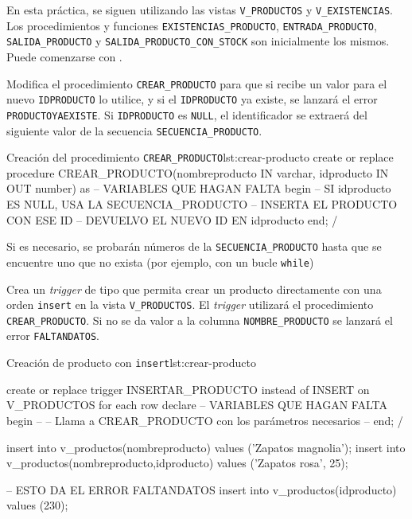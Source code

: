 En esta práctica, se siguen utilizando las vistas \texttt{V\_PRODUCTOS} y \texttt{V\_EXISTENCIAS}. Los procedimientos y funciones \texttt{EXISTENCIAS\_PRODUCTO}, \texttt{ENTRADA\_PRODUCTO}, \texttt{SALIDA\_PRODUCTO} y \texttt{SALIDA\_PRODUCTO\_CON\_STOCK} son inicialmente los mismos. Puede comenzarse con .


\begin{homeworkProblem}

  Modifica el procedimiento \texttt{CREAR\_PRODUCTO} para que si recibe un valor para el nuevo \texttt{IDPRODUCTO} lo utilice,  y si el \texttt{IDPRODUCTO} ya existe, se lanzará el error \texttt{PRODUCTOYAEXISTE}.
  Si \texttt{IDPRODUCTO} es \texttt{NULL}, el identificador se extraerá del siguiente valor de la secuencia \texttt{SECUENCIA\_PRODUCTO}.

\begin{listadosql}{Creación del procedimiento \texttt{CREAR\_PRODUCTO}}{lst:crear-producto}
create or replace procedure CREAR_PRODUCTO(nombreproducto IN varchar, idproducto IN OUT number)
as 
-- VARIABLES QUE HAGAN FALTA
begin
-- SI idproducto ES NULL, USA LA SECUENCIA_PRODUCTO
-- INSERTA EL PRODUCTO CON ESE ID
-- DEVUELVO EL NUEVO ID EN idproducto
end;
/
\end{listadosql}

  \begin{Aviso}
    Si es necesario, se probarán números de la \texttt{SECUENCIA\_PRODUCTO} hasta que se encuentre uno que no exista (por ejemplo, con un bucle \texttt{while})
  \end{Aviso}
  
  Crea un \textit{trigger} de tipo  que permita crear un producto directamente con una orden \texttt{insert} en la vista \texttt{V\_PRODUCTOS}. El \textit{trigger} utilizará el procedimiento \texttt{CREAR\_PRODUCTO}. Si no se da valor a la columna \texttt{NOMBRE\_PRODUCTO} se lanzará el error \texttt{FALTANDATOS}.
  
\begin{listadosql}{Creación de producto con \texttt{insert}}{lst:crear-producto}


create or replace trigger INSERTAR_PRODUCTO
instead of INSERT on V_PRODUCTOS
for each row
declare
-- VARIABLES QUE HAGAN FALTA
begin
-- 
-- Llama a CREAR_PRODUCTO con los parámetros necesarios
-- 
end;
/


insert into v_productos(nombreproducto) values ('Zapatos magnolia');
insert into v_productos(nombreproducto,idproducto) values ('Zapatos rosa', 25);

-- ESTO DA EL ERROR FALTANDATOS
insert into v_productos(idproducto) values (230);


\end{listadosql}

\end{homeworkProblem}


